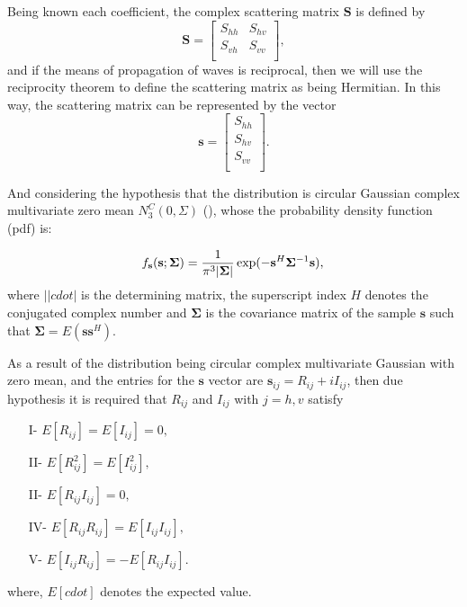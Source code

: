 \documentclass[conference]{IEEEtran}
\begin{document}
{{{{Being known each coefficient, the complex scattering matrix $\mathbf{S}$ is defined by
\begin{equation}\label{eq_01}
\mathbf{S} = \left[
\begin{array}{cc}
	S_{hh}   & S_{hv}   \\
	S_{vh}   & S_{vv}   \\
\end{array}
\right],
\end{equation}
and if the means of propagation of waves is reciprocal, then we will use the reciprocity theorem \cite{lp} to define the scattering matrix as being Hermitian. In this way, the scattering matrix can be represented by the vector
\begin{equation}\label{eq_02}
\mathbf{s} = \left[
\begin{array}{c}
	S_{hh}     \\
    S_{hv}     \\
	S_{vv}     \\
\end{array}
\right].
\end{equation}

And considering the hypothesis that the distribution is circular Gaussian complex multivariate zero mean $N^C_3(0,\Sigma)$ (\cite{good, lee}), whose the probability density function (pdf) is:

\begin{equation}\label{eq_03}
    f_{\mathbf{s}}(\mathbf{s};\mathbf{\Sigma})=\frac{1}{\pi^3|\mathbf{\Sigma}|} \exp(-\mathbf{s}^H\mathbf{\Sigma}^{-1}\mathbf{s}), \\
\end{equation}
where $||cdot|$ is the determining matrix, the superscript index $H$ denotes the conjugated complex number and $\mathbf{\Sigma}$ is the covariance matrix of the sample $\mathbf{s}$ such that $\mathbf{\Sigma}=E(\mathbf{ss}^H)$. 

As a result of the distribution being circular complex multivariate Gaussian with zero mean, and the entries for the $\mathbf{s}$ vector are $\mathbf{s}_{ij}= R_{ij}+ i I_{ij}$, then due hypothesis it is required that $R_{ij}$ and $I_{ij}$ with $j=h,v$ satisfy 
\begin{itemize}
	\item[I-] $E[R_{ij}]=E[I_{ij}]=0,$
	\item[II-] $E[R_{ij}^2]=E[I_{ij}^2],$ 
	\item[II-] $E[R_{ij}I_{ij}]=0,$  
	\item[IV-] $E[R_{ij}R_{ij}]=E[I_{ij}I_{ij}],$ 
	\item[V-] $E[I_{ij}R_{ij}]=-E[R_{ij}I_{ij}].$
\end{itemize}
where, $E[cdot]$ denotes the expected value. 

}}}}
\end{document}
